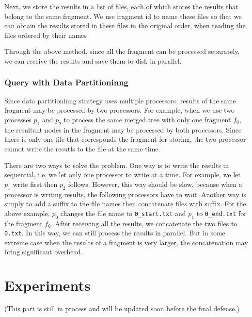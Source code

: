 Next, we store the results in a list of files, each of which stores the results
that belong to the same fragment. We use fragment id to name these files so
that we can obtain the results stored in these files in the original order, when
reading the files ordered by their names

Through the above method, since all the fragment can be processed separately, we
can receive the results and save them to disk in parallel.

\subsubsection{Query with Data Partitioninng}

Since data partitioninng strategy uses multiple processors, results of the same
fragment may be processed by two processors. For example, when we use two
processes $p_1$ and $p_2$ to process the same merged tree with only one fragment
$f_0$, the resultant nodes in the fragment may be processed by both processors.
Since there is only one file that corresponds the fragment for storing, the two
processor cannot write the resutls to the file at the same time.

There are two ways to solve the problem. One way is to write the results in
sequential, i.e. we let only one processor to write at a time. For example, we
let $p_1$ write first then $p_2$ follows. However, this way should be slow, because
when a processor is writing results, the following processors have to wait.
Another way is simply to add a suffix to the file names then concatenate files
with suffix. For the above example, $p_0$ changes the file name to
\texttt{0\_start.txt} and $p_1$ to \texttt{0\_end.txt} for the fragment $f_0$.
After receiving all the results, we concatenate the two files to \texttt{0.txt}.
In this way, we can still process the results in parallel. But in some extreme
case when the results of a fragment is very larger, the concatenation may bring
significant overhead.




\section{Experiments}

(This part is still in process and will be updated soon before the final defense.)
